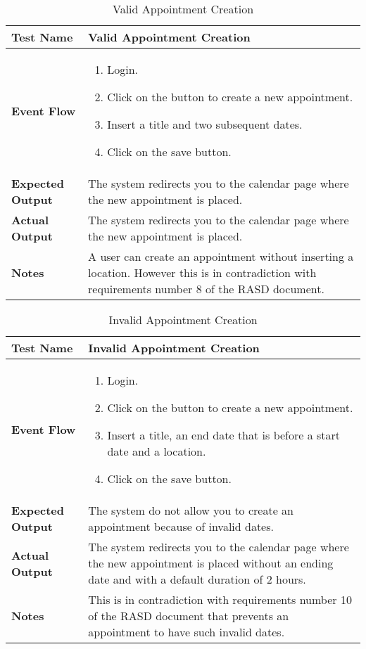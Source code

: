 \begin{table}[h]	
\centering
\def\arraystretch{1.5}
\begin{tabular}{|m{7cm}|m{7cm}|}
	\hline
	\textbf{Test Name}            & Valid Appointment Creation   \\ \hline
	\textbf{Event Flow}             & 
	 	\begin{enumerate}
	 	\item Login.
	 	\item Click on the button to create a new appointment.
	 	\item Insert a title and two subsequent dates.
	 	\item Click on the save button.
	 \end{enumerate} \\ \hline
	\textbf{Expected Output}  &  The system redirects you to the calendar page where the new appointment is placed.   \\ \hline
	\textbf{Actual Output}       & The system redirects you to the calendar page where the new appointment is placed.    \\ \hline
	\textbf{Notes} & A user can create an appointment without inserting a location. However this is in contradiction with requirements number 8 of the RASD document. \\ \hline
\end{tabular}
\caption{Valid Appointment Creation}
\end{table}


\begin{table}[h]	
	\centering
	\def\arraystretch{1.5}
	\begin{tabular}{|m{7cm}|m{7cm}|}
		\hline
		\textbf{Test Name}            & Invalid Appointment Creation   \\ \hline
		\textbf{Event Flow}             & 
		\begin{enumerate}
			\item Login.
			\item Click on the button to create a new appointment.
			\item Insert a title, an end date that is before a start date and a location.
			\item Click on the save button.
		\end{enumerate} \\ \hline
		\textbf{Expected Output}  &  The system do not allow you to create an appointment because of invalid dates.   \\ \hline
		\textbf{Actual Output}       & The system redirects you to the calendar page where the new appointment is placed without an ending date and with a default duration of 2 hours.    \\ \hline
		\textbf{Notes} & This is in contradiction with requirements number 10 of the RASD document that prevents an appointment to have such invalid dates. \\ \hline
	\end{tabular}
	\caption{Invalid Appointment Creation}
\end{table}


